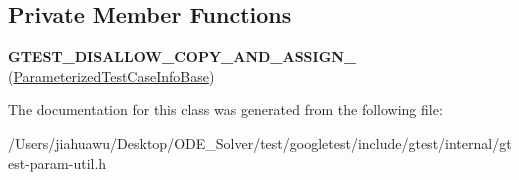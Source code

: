 \subsection*{Private Member Functions}
\begin{DoxyCompactItemize}
\item 
\mbox{\label{classtesting_1_1internal_1_1_parameterized_test_case_info_base_a67505987d1b00a12deb259093797c967}} 
{\bfseries G\+T\+E\+S\+T\+\_\+\+D\+I\+S\+A\+L\+L\+O\+W\+\_\+\+C\+O\+P\+Y\+\_\+\+A\+N\+D\+\_\+\+A\+S\+S\+I\+G\+N\+\_\+} (\mbox{\hyperlink{classtesting_1_1internal_1_1_parameterized_test_case_info_base}{Parameterized\+Test\+Case\+Info\+Base}})
\end{DoxyCompactItemize}


The documentation for this class was generated from the following file\+:\begin{DoxyCompactItemize}
\item 
/\+Users/jiahuawu/\+Desktop/\+O\+D\+E\+\_\+\+Solver/test/googletest/include/gtest/internal/gtest-\/param-\/util.\+h\end{DoxyCompactItemize}
